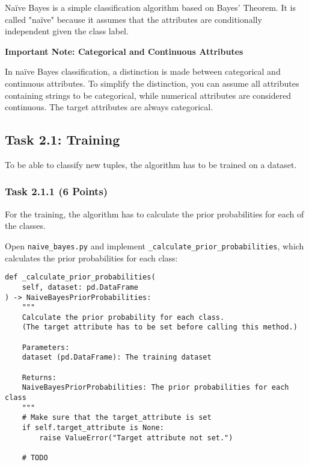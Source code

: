 \documentclass[
english,
smallborders
]{i6prcsht}
\newcommand{\points}[1]{\hfill \color{red}(#1 Points)\color{black}}
\begin{document}
Naïve Bayes is a simple classification algorithm based on Bayes' Theorem. It is called "naïve" because it assumes that the attributes are conditionally independent given the class label.

\vspace*{1mm}

\begin{mdframed}
	\begin{em}
		\textbf{Important Note: Categorical and Continuous Attributes}
		
		In naïve Bayes classification, a distinction is made between categorical and continuous attributes. To simplify the distinction, you can assume all attributes containing strings to be categorical, while numerical attributes are considered continuous. The target attributes are always categorical.
	\end{em}
\end{mdframed}

\subsection*{Task 2.1: Training}

To be able to classify new tuples, the algorithm has to be trained on a dataset.

\subsubsection*{Task 2.1.1 \points{6}}

For the training, the algorithm has to calculate the prior probabilities for each of the classes.

Open \texttt{naive\_bayes.py} and implement \texttt{\_calculate\_prior\_probabilities}, which calculates the prior probabilities for each class:

\vspace*{0.3cm}

\begin{lstlisting}
def _calculate_prior_probabilities(
	self, dataset: pd.DataFrame
) -> NaiveBayesPriorProbabilities:
	"""
	Calculate the prior probability for each class.
	(The target attribute has to be set before calling this method.)

	Parameters:
	dataset (pd.DataFrame): The training dataset

	Returns:
	NaiveBayesPriorProbabilities: The prior probabilities for each class
	"""
	# Make sure that the target_attribute is set
	if self.target_attribute is None:
		raise ValueError("Target attribute not set.")

	# TODO
\end{lstlisting}
\end{document}
